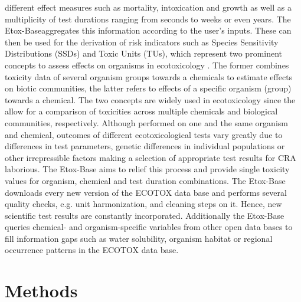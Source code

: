 \documentclass[english]{article}
\newcommand{\etoxbase}{Etox-Base}
\begin{document}
different effect measures such as mortality, intoxication and growth as well as a multiplicity of test durations ranging from seconds to weeks or even years. The \etoxbase aggregates this information according to the user's inputs. These can then be used for the derivation of risk indicators such as Species Sensitivity Distributions (SSDs) \citep{posthuma_species_2002} and Toxic Units (TUs), which represent two prominent concepts to assess effects on organisms in ecotoxicology . The former combines toxicity data of several organism groups towards a chemicals to estimate effects on biotic communities, the latter refers to effects of a specific organism (group) towards a chemical. The two concepts are widely used in ecotoxicology \citep{kefford_definition_2011, schafer_effects_2011} since the allow for a comparison of toxicities across multiple chemicals and biological communities, respectively. Although performed on one and the same organism and chemical, outcomes of different ecotoxicological tests vary greatly due to differences in test parameters, genetic differences in individual populations or other irrepressible factors making a selection of appropriate test results for CRA laborious. The \etoxbase{} aims to relief this process and provide single toxicity values for organism, chemical and test duration combinations. The \etoxbase{} downloads every new version of the ECOTOX data base and performs several quality checks, e.g. unit harmonization, and cleaning steps on it. Hence, new scientific test results are constantly incorporated. Additionally the \etoxbase{} queries chemical- and organism-specific variables from other open data bases to fill information gaps such as water solubility, organism habitat or regional occurrence patterns in the ECOTOX data base.

\section*{Methods}

\end{document}
